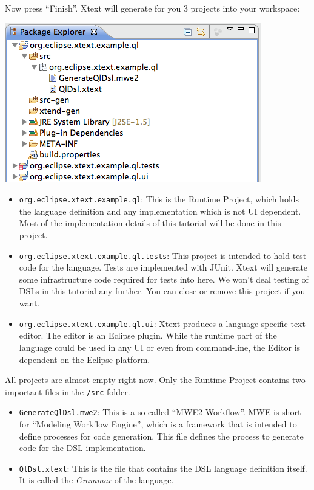 Now press ``Finish''. Xtext will generate for you 3 projects into your workspace:

\includegraphics{./images/chapter01/WorkspaceAfterWizard.png}

\begin{itemize}
  \item \texttt{org.eclipse.xtext.example.ql}: This is the Runtime Project,
  which holds the language definition and any implementation which is not UI
  dependent. Most of the implementation details of this tutorial will be done in
  this project.
  \item \texttt{org.eclipse.xtext.example.ql.tests}: This project is intended to
  hold test code for the language. Tests are implemented with JUnit. Xtext will
  generate some infrastructure code required for tests into here. We won't deal
  testing of DSLs in this tutorial any further. You can close or remove this
  project if you want.
  \item \texttt{org.eclipse.xtext.example.ql.ui}: Xtext produces a language
  specific text editor. The editor is an Eclipse plugin. While the runtime part
  of the language could be used in any UI or even from command-line, the Editor
  is dependent on the Eclipse platform.
\end{itemize}

All projects are almost empty right now. Only the Runtime Project contains two
important files in the \texttt{/src} folder.
\begin{itemize}
  \item \texttt{GenerateQlDsl.mwe2}: This is a so-called ``MWE2 Workflow''. MWE
  is short for ``Modeling Workflow Engine'', which is a framework that is
  intended to define processes for code generation. This file defines the
  process to generate code for the DSL implementation.
  \item \texttt{QlDsl.xtext}: This is the file that contains the DSL language
  definition itself. It is called the \emph{Grammar} of the language.
\end{itemize}

